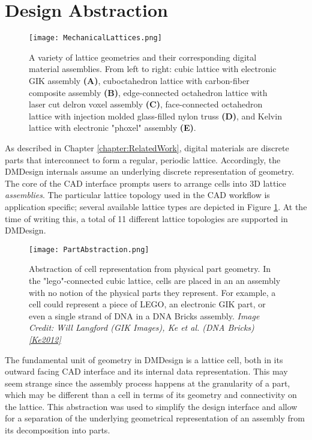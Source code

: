 {\section{Design Abstraction}

\begin{figure}
  \texttt{[image: MechanicalLattices.png]}
  \caption{A variety of lattice geometries and their corresponding digital material assemblies.  From left to right: cubic lattice with electronic GIK assembly \textbf{(A)}, cuboctahedron lattice with carbon-fiber composite assembly \textbf{(B)}, edge-connected octahedron lattice with laser cut delron voxel assembly \textbf{(C)}, face-connected octahedron lattice with injection molded glass-filled nylon truss \textbf{(D)}, and Kelvin lattice with electronic "phoxel" assembly \textbf{(E)}.}
  \label{fig:MechanicalLattices}
\end{figure}

As described in Chapter \ref{chapter:RelatedWork}, digital materials are discrete parts that interconnect to form a regular, periodic lattice.  Accordingly, the DMDesign internals assume an underlying discrete representation of geometry.  The core of the CAD interface prompts users to arrange cells into 3D lattice \textit{assemblies}.  The particular lattice topology used in the CAD workflow is application specific; several available lattice types are depicted in Figure \ref{fig:MechanicalLattices}.  At the time of writing this, a total of 11 different lattice topologies are supported in DMDesign.\\

\begin{figure}
  \texttt{[image: PartAbstraction.png]}
  \caption{Abstraction of cell representation from physical part geometry.  In the "lego"-connected cubic lattice, cells are placed in an an assembly with no notion of the physical parts they represent.  For example, a cell could represent a piece of LEGO, an electronic GIK part, or even a single strand of DNA in a DNA Bricks assembly.  \textit{Image Credit: Will Langford (GIK Images), Ke et al. (DNA Bricks) \ref{Ke2012}}}
  \label{fig:PartAbstraction}
\end{figure}

The fundamental unit of geometry in DMDesign is a lattice cell, both in its outward facing CAD interface and its internal data representation.  This may seem strange since the assembly process happens at the granularity of a part, which may be different than a cell in terms of its geometry and connectivity on the lattice.  This abstraction was used to simplify the design interface and allow for a separation of the underlying geometrical representation of an assembly from its decomposition into parts.\\

}
